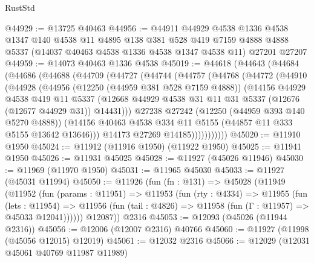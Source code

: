 \begin{lexlean}{RustStd}
\begin{coremodule}
@44929 := @13725 @40463
@44956 := @44911
    @44929
    @4538
    @1336
    @4538
    @1347
    @140
    @4538
    @11
    @4895
    @138
    @381
    @528
    @419
    @7159
    @4888
    @4888
    @5337
    (@14037 @40463 @4538 @1336 @4538 @1347 @4538 @11)
    @27201
    @27207
@44959 := @14073 @40463 @1336 @4538
@45019 := @44618
    (@44643
      (@44684
        (@44686
          (@44688
            (@44709
              (@44727
                (@44744
                  (@44757
                    (@44768
                      (@44772
                        (@44910
                          (@44928
                            (@44956
                              (@12250 (@44959 @381 @528 @7159 @4888))
                              (@14156
                                @44929
                                @4538
                                @419
                                @11
                                @5337
                                (@12668
                                  @44929
                                  @4538
                                  @31
                                  @11
                                  @31
                                  @5337
                                  (@12676 (@12677 @44929 @31))
                                  @14431)))
                            @27238
                            @27242
                            (@12250 (@44959 @393 @140 @5270 @4888))
                            (@14156
                              @40463
                              @4538
                              @334
                              @11
                              @5155
                              (@44857 @11 @333 @5155 @13642 @13646)))
                          @14173
                          @27269
                          @14185)))))))))))
@45020 := @11910 @1950
@45024 := @11912 (@11916 @1950) (@11922 @1950)
@45025 := @11941 @1950
@45026 := @11931 @45025
@45028 := @11927 (@45026 @11946)
@45030 := @11969 (@11970 @1950)
@45031 := @11965 @45030
@45033 := @11927 (@45031 @11994)
@45050 := @11926
    (fun (fn : @131) =>
    @45028
      (@11949
        (@11952
          (fun (params : @11951) =>
          @11953
            (fun (rty : @4334) =>
            @11955
              (fun (lets : @11954) =>
              @11956 (fun (tail : @4826) => @11958 (fun (Γ : @11957) => @45033 @12041))))))
        @12087))
    @2316
@45053 := @12093 (@45026 (@11944 @2316))
@45056 := @12006 (@12007 @2316) @40766
@45060 := @11927 (@11998 (@45056 @12015) @12019)
@45061 := @12032 @2316
@45066 := @12029 (@12031 @45061 @40769 @11987 @11989)

\end{coremodule}
\end{lexlean}
